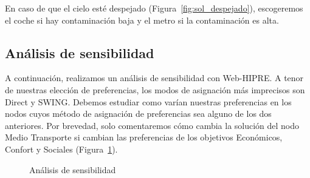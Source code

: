 \documentclass[12pt,a4paper,twoside,openright,titlepage,final]{article}
\begin{document}
En caso de que el cielo esté despejado (Figura~\ref{fig:sol_despejado}), escogeremos el coche si hay contaminación baja y el metro si la contaminación es alta.\\

\subsection{Análisis de sensibilidad}

A continuación, realizamos un análisis de sensibilidad con Web-HIPRE. A tenor de nuestras elección de preferencias, los modos de asignación más imprecisos son Direct y SWING. Debemos estudiar como varían nuestras preferencias en los nodos cuyos método de asignación de preferencias sea alguno de los dos anteriores. Por brevedad, solo comentaremos cómo cambia la solución del nodo Medio Transporte si cambian las preferencias de los objetivos Económicos, Confort y Sociales (Figura~\ref{fig:sensibilidad}).\\


\begin{figure}[htbp!]
\centering
{}
\caption{Análisis de sensibilidad} \label{fig:sensibilidad}
\end{figure}
\end{document}
